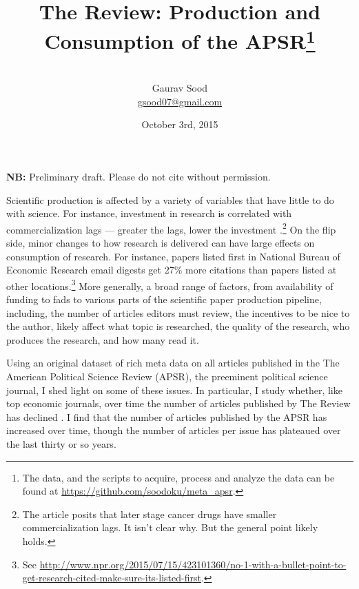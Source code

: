 \documentclass[12pt]{article}
\begin{document}
\title{\vspace{-.5cm}\normalsize{The Review: Production and Consumption of the APSR\footnote{The data, and the scripts to acquire, process and analyze the data can be found at \href{https://github.com/soodoku/meta_apsr}{https://github.com/soodoku/meta\_apsr}.}
}}
\author{\vspace{.2cm}\\\normalsize{Gaurav Sood}\\\href{mailto:gsood07@gmail.com}{\small{gsood07@gmail.com}}\vspace{.3cm}\\}
\date{\normalsize{October 3rd, 2015}}
\maketitle
\begin{center}
\textbf{NB:} Preliminary draft. Please do not cite without permission.
\end{center}
\vspace{.4cm}
\doublespacing

Scientific production is affected by a variety of variables that have little to do with science. For instance, investment in research is correlated with commercialization lags --- greater the lags, lower the investment \citep{budish2013firms}.\footnote{The article posits that later stage cancer drugs have smaller commercialization lags. It isn't clear why. But the general point likely holds.} On the flip side, minor changes to how research is delivered can have large effects on consumption of research. For instance, papers listed first in National Bureau of Economic Research email digests get 27\% more citations than papers listed at other locations.\footnote{ See \href{http://www.npr.org/2015/07/15/423101360/no-1-with-a-bullet-point-to-get-research-cited-make-sure-its-listed-first}{http://www.npr.org/2015/07/15/423101360/no-1-with-a-bullet-point-to-get-research-cited-make-sure-its-listed-first}.} More generally, a broad range of factors, from availability of funding to fads to various parts of the scientific paper production pipeline, including, the number of articles editors must review, the incentives to be nice to the author, likely affect what topic is researched, the quality of the research, who produces the research, and how many read it. 

Using an original dataset of rich meta data on all articles published in the The American Political Science Review (APSR), the preeminent political science journal, I shed light on some of these issues. In particular, I study whether, like top economic journals, over time the number of articles published by The Review has declined \citep{card2013nine, card2014page}. I find that the number of articles published by the APSR has increased over time, though the number of articles per issue has plateaued over the last thirty or so years.
\end{document}
